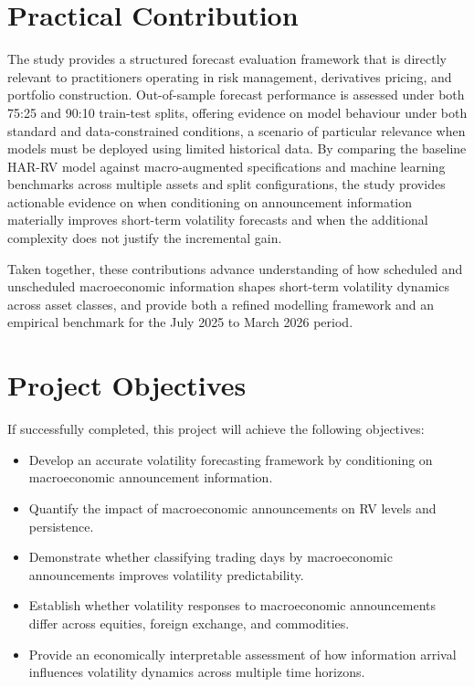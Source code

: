 \documentclass[12pt,a4paper]{report}
\begin{document}
\section{Practical Contribution}
The study provides a structured forecast evaluation framework that is directly relevant to practitioners operating in risk management, derivatives pricing, and portfolio construction. Out-of-sample forecast performance is assessed under both 75:25 and 90:10 train-test splits, offering evidence on model behaviour under both standard and data-constrained conditions, a scenario of particular relevance when models must be deployed using limited historical data. By comparing the baseline HAR-RV model against macro-augmented specifications and machine learning benchmarks across multiple assets and split configurations, the study provides actionable evidence on when conditioning on announcement information materially improves short-term volatility forecasts and when the additional complexity does not justify the incremental gain.

Taken together, these contributions advance understanding of how scheduled and unscheduled macroeconomic information shapes short-term volatility dynamics across asset classes, and provide both a refined modelling framework and an empirical benchmark for the July 2025 to March 2026 period.


\section{Project Objectives}
If successfully completed, this project will achieve the following objectives:

\begin{itemize}
\item Develop an accurate volatility forecasting framework by conditioning on macroeconomic announcement information.
\item Quantify the impact of macroeconomic announcements on RV levels and persistence.
\item Demonstrate whether classifying trading days by macroeconomic announcements improves volatility predictability.
\item Establish whether volatility responses to macroeconomic announcements differ across equities, foreign exchange, and commodities.
\item Provide an economically interpretable assessment of how information arrival influences volatility dynamics across multiple time horizons.
\end{itemize}
\end{document}
